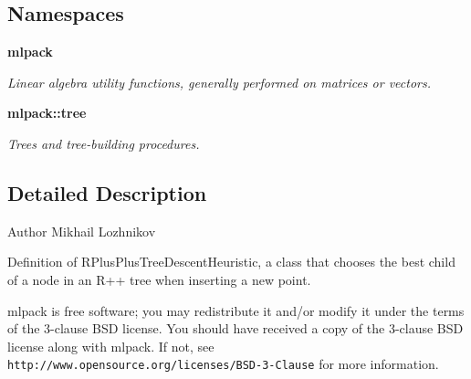 \subsection*{Namespaces}
\begin{DoxyCompactItemize}
\item 
 {\bf mlpack}
\begin{DoxyCompactList}\small\item\em Linear algebra utility functions, generally performed on matrices or vectors. \end{DoxyCompactList}\item 
 {\bf mlpack\+::tree}
\begin{DoxyCompactList}\small\item\em Trees and tree-\/building procedures. \end{DoxyCompactList}\end{DoxyCompactItemize}


\subsection{Detailed Description}
\begin{DoxyAuthor}{Author}
Mikhail Lozhnikov
\end{DoxyAuthor}
Definition of R\+Plus\+Plus\+Tree\+Descent\+Heuristic, a class that chooses the best child of a node in an R++ tree when inserting a new point.

mlpack is free software; you may redistribute it and/or modify it under the terms of the 3-\/clause B\+SD license. You should have received a copy of the 3-\/clause B\+SD license along with mlpack. If not, see {\tt http\+://www.\+opensource.\+org/licenses/\+B\+S\+D-\/3-\/\+Clause} for more information. 